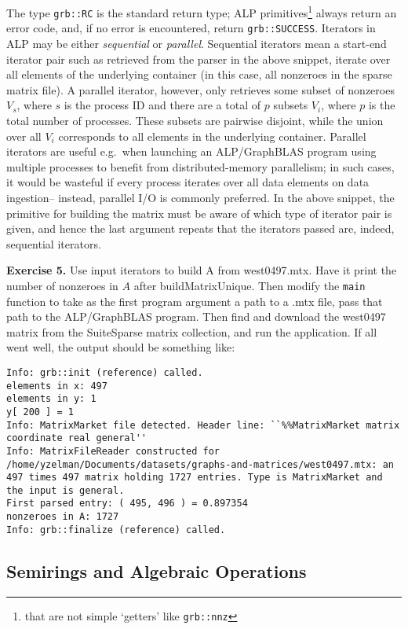 The type \texttt{grb::RC} is the standard return type; ALP primitives\footnote{that are not simple `getters' like \texttt{grb::nnz}} always return an error code, and, if no error is encountered, return \texttt{grb::SUCCESS}. Iterators in ALP may be either \emph{sequential} or \emph{parallel}. Sequential iterators mean a start-end iterator pair such as retrieved from the parser in the above snippet, iterate over all elements of the underlying container (in this case, all nonzeroes in the sparse matrix file). A parallel iterator, however, only retrieves some subset of nonzeroes $V_s$, where $s$ is the process ID and there are a total of $p$ subsets $V_i$, where $p$ is the total number of processes. These subsets are pairwise disjoint, while the union over all $V_i$ corresponds to all elements in the underlying container. Parallel iterators are useful e.g.\ when launching an ALP/GraphBLAS program using multiple processes to benefit from distributed-memory parallelism; in such cases, it would be wasteful if every process iterates over all data elements on data ingestion-- instead, parallel I/O is commonly preferred. In the above snippet, the primitive for building the matrix must be aware of which type of iterator pair is given, and hence the last argument repeats that the iterators passed are, indeed, sequential iterators.

\textbf{Exercise 5.} Use input iterators to build A from west0497.mtx. Have it print the number of nonzeroes in $A$ after buildMatrixUnique. Then modify the \texttt{main} function to take as the first program argument a path to a .mtx file, pass that path to the ALP/GraphBLAS program. Then find and download the west0497 matrix from the SuiteSparse matrix collection, and run the application. If all went well, the output should be something like:
\begin{lstlisting}
Info: grb::init (reference) called.
elements in x: 497
elements in y: 1
y[ 200 ] = 1
Info: MatrixMarket file detected. Header line: ``%%MatrixMarket matrix coordinate real general''
Info: MatrixFileReader constructed for /home/yzelman/Documents/datasets/graphs-and-matrices/west0497.mtx: an 497 times 497 matrix holding 1727 entries. Type is MatrixMarket and the input is general.
First parsed entry: ( 495, 496 ) = 0.897354
nonzeroes in A: 1727
Info: grb::finalize (reference) called.
\end{lstlisting}

\subsection{Semirings and Algebraic Operations}

